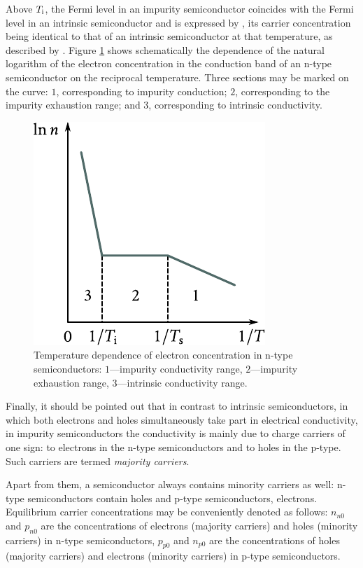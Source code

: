 Above $T_{\text{i}}$, the Fermi level in an impurity semiconductor coincides with the Fermi level in an intrinsic semiconductor and is expressed by , its carrier concentration being identical to that of an intrinsic semiconductor at that temperature, as described by . Figure \ref{fig:5_22} shows schematically the dependence of the natural logarithm of the electron concentration in the conduction band of an n-type semiconductor on the reciprocal temperature.
Three sections may be marked on the curve: $1$, corresponding to impurity conduction; $2$, corresponding to the impurity exhaustion range; and $3$, corresponding to intrinsic conductivity.

\begin{figure}[t]
	\begin{center}
		\includegraphics[scale=0.95]{figures/ch_05/fig_5_22.pdf}
		\caption[]{Temperature dependence of electron concentration in n-type semiconductors: $1$---impurity conductivity range, $2$---impurity exhaustion range, $3$---intrinsic conductivity range.}
		\label{fig:5_22}
	\end{center}
	\vspace{-0.7cm}
\end{figure}

Finally, it should be pointed out that in contrast to intrinsic semiconductors, in which both electrons and holes simultaneously take part in electrical conductivity, in impurity semiconductors the conductivity is mainly due to charge carriers of one sign: to electrons in the n-type semiconductors and to holes in the p-type. Such carriers are termed \textit{majority carriers}.

Apart from them, a semiconductor always contains minority carriers as well: n-type semiconductors contain holes and p-type semiconductors, electrons. Equilibrium carrier concentrations may be conveniently denoted as follows: $n_{n0}$ and $p_{n0}$ are the concentrations of electrons (majority carriers) and holes (minority carriers) in n-type semiconductors, $p_{p0}$ and $n_{p0}$ are the concentrations of holes (majority carriers) and electrons (minority carriers) in p-type semiconductors.

